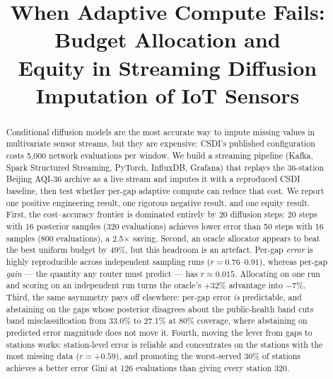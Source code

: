 \documentclass[conference]{IEEEtran}
\begin{document}
\title{When Adaptive Compute Fails: Budget Allocation and\\
Equity in Streaming Diffusion Imputation of IoT Sensors}

\author{
\and
{}
\and
{}
\and
{}
\and
{}}

\maketitle

\begin{abstract}
Conditional diffusion models are the most accurate way to impute missing values
in multivariate sensor streams, but they are expensive: CSDI's published
configuration costs 5{,}000 network evaluations per window. We build a streaming
pipeline (Kafka, Spark Structured Streaming, PyTorch, InfluxDB, Grafana) that
replays the 36-station Beijing AQI-36 archive as a live stream and imputes it
with a reproduced CSDI baseline, then test whether per-gap adaptive compute can
reduce that cost. We report one positive engineering result, one rigorous
negative result, and one equity result. First, the cost--accuracy frontier is
dominated entirely by 20 diffusion steps: 20 steps with 16 posterior samples
(320 evaluations) achieves lower error than 50 steps with 16 samples (800
evaluations), a 2.5$\times$ saving. Second, an oracle allocator appears to beat
the best uniform budget by 49\%, but this headroom is an artefact. Per-gap
\emph{error} is highly reproducible across independent sampling runs
($r=0.76$--$0.91$), whereas per-gap \emph{gain} --- the quantity any router must
predict --- has $r\approx0.015$. Allocating on one run and scoring on an
independent run turns the oracle's $+32\%$ advantage into $-7\%$. Third, the same asymmetry pays off elsewhere: per-gap error \emph{is}
predictable, and abstaining on the gaps whose posterior disagrees about the
public-health band cuts band misclassification from 33.0\% to 27.1\% at 80\%
coverage, where abstaining on predicted error magnitude does not move it.
Fourth, moving the lever from gaps to stations works: station-level error is reliable and
concentrates on the stations with the most missing data ($r=+0.59$), and
promoting the worst-served 30\% of stations achieves a better error Gini at 126
evaluations than giving every station 320.
\end{abstract}
\end{document}
